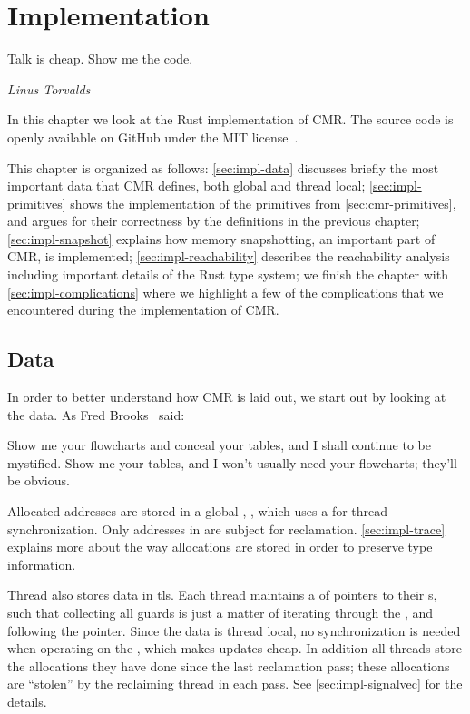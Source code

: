 \chapter{Implementation\label{ch:implementation}}

\epigraph{Talk is cheap. Show me the code.}{\textit{Linus Torvalds}}

In this chapter we look at the Rust implementation of CMR\@. The source code is openly available
on GitHub under the MIT license~\cite{cmr-github}.

This chapter is organized as follows: \cref{sec:impl-data} discusses briefly the most important
data that CMR defines, both global and thread local;
\cref{sec:impl-primitives} shows the implementation of the primitives from
\cref{sec:cmr-primitives}, and argues for their correctness by the definitions in the previous
chapter;
\cref{sec:impl-snapshot} explains how memory snapshotting, an important part of CMR, is
implemented;
\cref{sec:impl-reachability} describes the reachability analysis including important details of the
Rust type system;
we finish the chapter with \cref{sec:impl-complications} where we highlight a few of the
complications that we encountered during the implementation of CMR.

\clearpage

\section{Data\label{sec:impl-data}}

In order to better understand how CMR is laid out, we start out by looking at the data.
As Fred Brooks~\cite{brooks1995mythical} said:
\begin{displayquote}
Show me your flowcharts and conceal your tables, and I shall continue to be mystified. Show me your
  tables, and I won't usually need your flowcharts; they'll be obvious.
\end{displayquote}

Allocated addresses are stored in a global , , which uses a 
for thread synchronization. Only addresses in  are subject for reclamation.
\cref{sec:impl-trace} explains more about the way allocations are stored in order to preserve type
information.

Thread also stores data in \gls{tls}. Each thread maintains a  of pointers to their
s, such that collecting all guards is just a matter of iterating through the
, and following the pointer. Since the data is thread local, no synchronization is needed
when operating on the , which makes updates cheap.
In addition all threads store the allocations they have done since the last reclamation pass;
these allocations are ``stolen'' by the reclaiming thread in each pass. See
\cref{sec:impl-signalvec} for the details.

